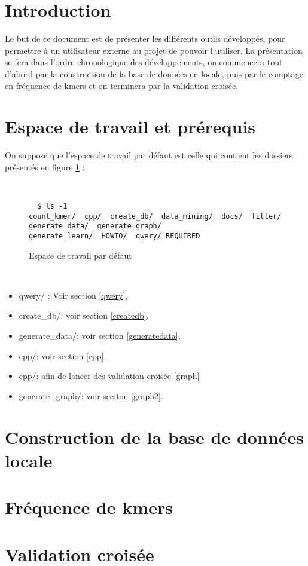 \documentclass[10pt,a4paper]{article}
\begin{document}


\newpage
\tableofcontents
\newpage
\listoffigures

\newpage
\section{Introduction}
\vspace{10em}
Le but de ce document est de présenter les différents outils développés, pour permettre à un utilisateur externe au projet de 
pouvoir l'utiliser. La présentation se fera dans l'ordre chronologique des développements, on commencera tout d'abord par la
construction de la base de données en locale, puis par le comptage en fréquence de kmers et on terminera par la validation croisée.
\newpage

\section{Espace de travail et prérequis}
On suppose que l'espace de travail par défaut est celle qui contient les dossiers présentés en figure \ref{ws}  :

~\\
\begin{figure}[H]

\begin{center}
\begin{verbatim}
  $ ls -1
count_kmer/  cpp/  create_db/  data_mining/  docs/  filter/ generate_data/  generate_graph/  
generate_learn/  HOWTO/  qwery/ REQUIRED
\end{verbatim}


\end{center}
\caption{\label{ws}Espace de travail par défaut}
\end{figure}
~\\

\begin{itemize}
  \item qwery/ : Voir section \ref{qwery},
  \item create\_db/: voir section \ref{createdb},
  \item generate\_data/: voir section \ref{generatedata},
  \item cpp/: voir section \ref{cpp},
  \item cpp/: afin de lancer des validation croisée \ref{graph}
  \item generate\_graph/: voir seciton \ref{graph2}.
\end{itemize}
\newpage

\section{Construction de la base de données locale}

\newpage
\section{Fréquence de kmers}


\newpage
\section{Validation croisée}

\end{document}
